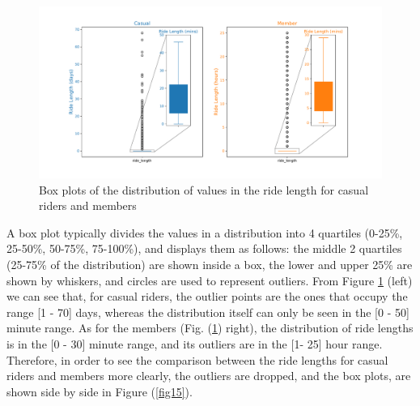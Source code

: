 \documentclass[12pt]{article}
\begin{document}
	\begin{figure}[h]
	\centering
	\includegraphics[scale=0.5]{boxplot_distribution.pdf} 
	\caption{Box plots of the distribution of values in the ride length for casual riders and members}
	\label{fig13}
	\end{figure}
	
A box plot typically divides the values in a distribution into 4 quartiles (0-25\%, 25-50\%, 50-75\%, 75-100\%), and displays them as follows: the middle 2 quartiles (25-75\% of the distribution) are shown inside a box, the lower and upper 25\% are shown by whiskers, and circles are used to represent outliers. From Figure \ref{fig13} (left) we can see that, for casual riders, the outlier points are the ones that occupy the range [1 - 70] days, whereas the distribution itself can only be seen in the [0 - 50] minute range. As for the members (Fig. (\ref{fig13}) right), the distribution of ride lengths is in the [0 - 30] minute range, and its outliers are in the [1- 25] hour range. Therefore, in order to see the comparison between the ride lengths for casual riders and members more clearly, the outliers are dropped, and the box plots, are shown side by side in Figure (\ref{fig15}). 
\end{document}
